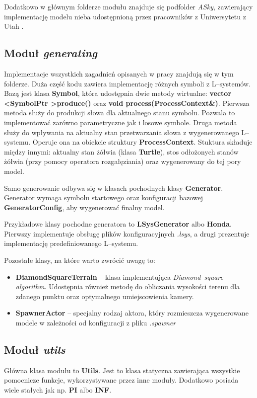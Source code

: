 \documentclass[inz,longabstract]{iithesis}
\begin{document}
            Dodatkowo w głównym folderze modułu znajduje się podfolder \textit{ASky}, zawierający implementację modelu nieba udostępnioną przez pracowników z Uniwersytetu z Utah \cite{sky}.
            
        \subsection{Moduł \textit{generating}}
            Implementacje wszystkich zagadnień opisanych w pracy znajdują się w tym folderze. Duża część kodu zawiera implementację różnych symboli z L--systemów. Bazą jest klasa \textbf{Symbol}, która udostępnia dwie metody wirtualne: \textbf{vector \textless SymbolPtr \textgreater produce()} oraz \textbf{void process(ProcessContext\&)}. Pierwsza metoda służy do produkcji słowa dla aktualnego stanu symbolu. Pozwala to implementować zarówno parametryczne jak i losowe symbole. Druga metoda służy do wpływania na aktualny stan przetwarzania słowa z wygenerowanego L--systemu. Operuje ona na obiekcie struktury \textbf{ProcessContext}. Stuktura składuje między innymi: aktualny stan żółwia (klasa \textbf{Turtle}), stos odłożonych stanów żółwia (przy pomocy operatora rozgałęziania) oraz wygenerowany do tej pory model.
            
            Samo generowanie odbywa się w klasach pochodnych klasy \textbf{Generator}. Generator wymaga symbolu startowego oraz konfiguracji bazowej \textbf{GeneratorConfig}, aby wygenerować finalny model.
            
            Przykładowe klasy pochodne generatora to \textbf{LSysGenerator} albo \textbf{Honda}. Pierwszy implementuje obsługę plików konfiguracyjnych \textit{.lsys}, a drugi prezentuje implementację predefiniowanego L--systemu.
            
            Pozostałe klasy, na które warto zwrócić uwagę to:
            \begin{itemize}
                \item \textbf{DiamondSquareTerrain} -- klasa implementująca \textit{Diamond--square algorithm}. Udostępnia również metodę do obliczania wysokości terenu dla zdanego punktu oraz optymalnego umiejscowienia kamery.
                \item \textbf{SpawnerActor} -- specjalny rodzaj aktora, który rozmieszcza wygenerowane modele w zależności od konfiguracji z pliku \textit{.spawner} 
            \end{itemize}
            
        \subsection{Moduł \textit{utils}}
            Główna klasa modułu to \textbf{Utils}. Jest to klasa statyczna zawierająca wszystkie pomocnicze funkcje, wykorzystywane przez inne moduły. Dodatkowo posiada wiele stałych jak np. \textbf{PI} albo \textbf{INF}.
            
\end{document}
